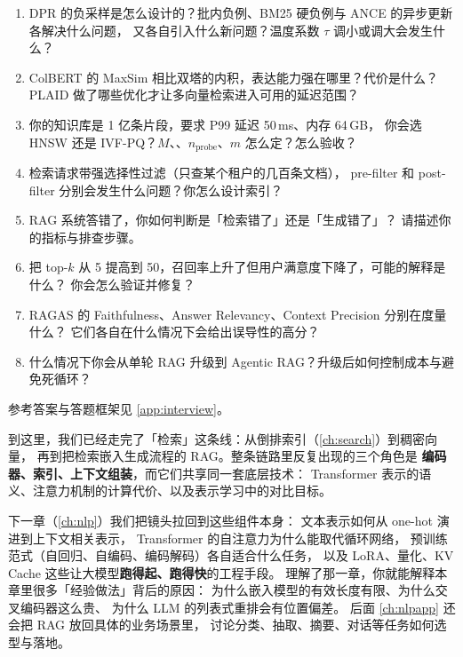 \begin{interview}[本章对应的面试题]
\begin{enumerate}
  \item DPR 的负采样是怎么设计的？批内负例、BM25 硬负例与 ANCE 的异步更新各解决什么问题，
        又各自引入什么新问题？温度系数 $\tau$ 调小或调大会发生什么？
  \item ColBERT 的 MaxSim 相比双塔的内积，表达能力强在哪里？代价是什么？
        PLAID 做了哪些优化才让多向量检索进入可用的延迟范围？
  \item 你的知识库是 1 亿条片段，要求 P99 延迟 50\,ms、内存 64\,GB，
        你会选 HNSW 还是 IVF-PQ？$M$、、$n_{\text{probe}}$、$m$ 怎么定？怎么验收？
  \item 检索请求带强选择性过滤（只查某个租户的几百条文档），
        pre-filter 和 post-filter 分别会发生什么问题？你怎么设计索引？
  \item RAG 系统答错了，你如何判断是「检索错了」还是「生成错了」？
        请描述你的指标与排查步骤。
  \item 把 top-$k$ 从 5 提高到 50，召回率上升了但用户满意度下降了，可能的解释是什么？
        你会怎么验证并修复？
  \item RAGAS 的 Faithfulness、Answer Relevancy、Context Precision 分别在度量什么？
        它们各自在什么情况下会给出误导性的高分？
  \item 什么情况下你会从单轮 RAG 升级到 Agentic RAG？升级后如何控制成本与避免死循环？
\end{enumerate}
参考答案与答题框架见 \cref{app:interview}。
\end{interview}

到这里，我们已经走完了「检索」这条线：从倒排索引（\cref{ch:search}）到稠密向量，
再到把检索嵌入生成流程的 RAG。整条链路里反复出现的三个角色是
\textbf{编码器、索引、上下文组装}，而它们共享同一套底层技术：
Transformer 表示的语义、注意力机制的计算代价、以及表示学习中的对比目标。

下一章（\cref{ch:nlp}）我们把镜头拉回到这些组件本身：
文本表示如何从 one-hot 演进到上下文相关表示，
Transformer 的自注意力为什么能取代循环网络，
预训练范式（自回归、自编码、编码解码）各自适合什么任务，
以及 LoRA、量化、KV Cache 这些让大模型\textbf{跑得起、跑得快}的工程手段。
理解了那一章，你就能解释本章里很多「经验做法」背后的原因：
为什么嵌入模型的有效长度有限、为什么交叉编码器这么贵、
为什么 LLM 的列表式重排会有位置偏差。
后面 \cref{ch:nlpapp} 还会把 RAG 放回具体的业务场景里，
讨论分类、抽取、摘要、对话等任务如何选型与落地。
